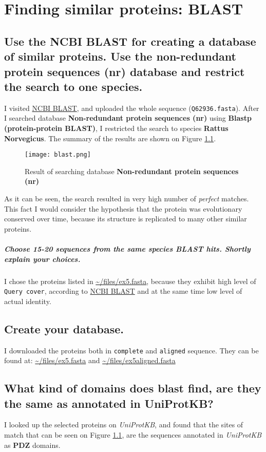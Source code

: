 \clearpage
\chapter{Finding similar proteins: BLAST}
\section{Use the NCBI BLAST for creating a database of similar proteins. Use the non-redundant protein
sequences (nr) database and restrict the search to one species.}

I visited \href{https://blast.ncbi.nlm.nih.gov/Blast.cgi?PAGE=Proteins&PROGRAM=blastp&BLAST_PROGRAMS=blastp&PAGE_TYPE=BlastSearch&BLAST_SPEC=blast2seq&DATABASE=n/a&QUERY=&SUBJECTS=}{NCBI BLAST}, and uploaded the whole sequence (\texttt{Q62936.fasta}). After I searched database \textbf{Non-redundant protein sequences (nr)} using \textbf{Blastp (protein-protein BLAST)}, I restricted the search to species \textbf{Rattus Norvegicus}. The summary of the results are shown on Figure \ref{blastsum}.

\begin{figure}
\centering
\texttt{[image: blast.png]}
\caption{Result of searching database \textbf{Non-redundant protein sequences (nr)}}
\label{blastsum}
\end{figure}

As it can be seen, the search resulted in very high number of \emph{perfect} matches. This fact I would consider the hypothesis that the protein was evolutionary conserved over time, because its structure is replicated to many other similar proteins.
\paragraph{Choose 15-20 sequences from the same species BLAST hits. Shortly explain your choices.}
I chose the proteins listed in \url{~/files/ex5.fasta}, because they exhibit high level of \texttt{Query cover}, according to \href{https://blast.ncbi.nlm.nih.gov/Blast.cgi}{NCBI BLAST} and at the same time low level of actual identity.

\section{Create your database.}
I downloaded the proteins both in \texttt{complete} and \texttt{aligned} sequence. They can be found at: \url{~/files/ex5.fasta} and \url{~/files/ex5aligned.fasta}

\section{What kind of domains does blast find, are they the same as annotated in UniProtKB?}
I looked up the selected proteins on \emph{UniProtKB}, and found that the sites of match that can be seen on Figure \ref{blastsum}, are the sequences annotated in \emph{UniProtKB} as \textbf{PDZ} domains.